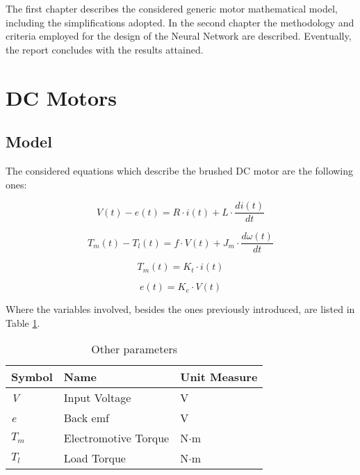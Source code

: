 The first chapter describes the considered generic motor mathematical model, including the simplifications adopted. In the second chapter the methodology and criteria employed for the design of the Neural Network are described. Eventually, the report concludes with the results attained.


\section{\textbf{DC Motors}}


\subsection{Model}

The considered equations which describe the brushed DC motor are the following ones:

\begin{equation}
 	V(t)-e(t) = R \cdot i(t)+L \cdot \dfrac{di(t)}{dt}
\end{equation}

\begin{equation}
	T_m(t)-T_l(t) = f \cdot V(t)+J_m \cdot \dfrac{d \omega (t)}{dt}
\end{equation}

\begin{equation}
	T_m(t) = K_t \cdot i(t)
\end{equation}

\begin{equation}
	e(t)= K_e \cdot V(t)
\end{equation}

Where the variables involved, besides the ones previously introduced, are listed in Table \ref{table:otherprm}.

\break

\begin{table}[h!] %
\centering	 
\renewcommand{\arraystretch}{1.5} 
\begin{tabular}{| l l l |} 
 \hline
 Symbol & Name & Unit Measure \\ [0.5ex]  
 \hline\hline
	\textit{V} & Input Voltage & V\\ 
	\textit{e} & Back emf & V\\
	\textit{$T_m$} & Electromotive Torque & N$\cdot$m\\
	\textit{$T_l$} & Load Torque & N$\cdot$m  \\ 
 \hline
\end{tabular}
\caption{Other parameters}
\label{table:otherprm}
\end{table}
	
